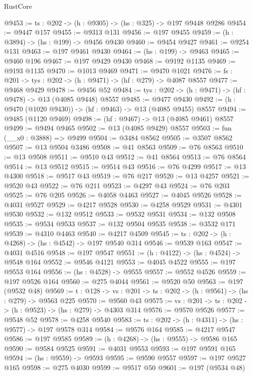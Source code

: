 \begin{lexlean}{RustCore}
\begin{coremodule}
@9453 := {ts : @202} -> (h : @9305) -> (hs : @325) -> @197 @9448 @9286
@9454 := @9447 @157
@9455 := @9313 @131
@9456 := @197 @9455
@9459 := (h : @3894) -> (hs : @199) -> @9456 @9430
@9460 := @9454 @9427
@9461 := @9254 @131
@9463 := @197 @9461 @9430
@9464 := (hs : @199) -> @9463
@9465 := @9460 @196
@9467 := @197 @9429 @9430
@9468 := @9192 @1135
@9469 := @9193 @1135
@9470 := @1013 @9469
@9471 := @9470 @1021
@9476 := {fs : @201} -> {tys : @202} -> (h : @9471) -> (hf : @279) -> @4087 @8557
@9477 := @9468 @9429
@9478 := @9456 @52
@9484 := {tys : @202} -> (h : @9471) -> (hf : @9478) -> @13 (@4085 @9448) @8557
@9485 := @9477 @9430
@9492 := (h : @9470 (@1020 @9430)) -> (hf : @9463) -> @13 (@4085 @9455) @8557
@9494 := @9485 (@1120 @9469)
@9498 := (hf : @9467) -> @13 (@4085 @9461) @8557
@9499 := @9494 @9465
@9502 := @13 (@4085 @9429) @8557
@9503 := fun (__x0 : @3888) => @9499
@9504 := @3484 @8562
@9505 := @3507 @8562
@9507 := @13 @9504 @3486
@9508 := @41 @8563
@9509 := @76 @8563
@9510 := @13 @9508
@9511 := @9510 @43
@9512 := @41 @8564
@9513 := @76 @8564
@9514 := @13 @9512
@9515 := @9514 @43
@9516 := @76 @4299
@9517 := @13 @4300
@9518 := @9517 @43
@9519 := @76 @217
@9520 := @13 @4257
@9521 := @9520 @43
@9522 := @76 @211
@9523 := @4297 @43
@9524 := @76 @203
@9525 := @76 @205
@9526 := @4058 @4463
@9527 := @4045 @9526
@9528 := @4031 @9527
@9529 := @4217 @9528
@9530 := @4258 @9529
@9531 := @4301 @9530
@9532 := @132 @9512
@9533 := @9532 @9531
@9534 := @132 @9508
@9535 := @9534 @9533
@9537 := @132 @9504 @9535
@9538 := @3532 @171
@9539 := @4310 @4463
@9540 := @4217 @4509
@9545 := {ts : @202} -> (h : @4268) -> (hs : @4542) -> @197 @9540 @314
@9546 := @9539 @163
@9547 := @4031 @4516
@9548 := @197 @9547
@9551 := (h : @4122) -> (hs : @4524) -> @9548 @164
@9552 := @9546 @4121
@9553 := @4045 @4522
@9555 := @197 @9553 @164
@9556 := (hs : @4528) -> @9555
@9557 := @9552 @4526
@9559 := @197 @9526 @164
@9560 := @275 @4044
@9561 := @9520 @50
@9563 := @197 (@9532 @48)
@9569 := {t : @128} -> {vs : @201} -> {ts : @202} -> (h : @9561) -> (hs : @279) -> @9563 @225
@9570 := @9560 @43
@9575 := {vs : @201} -> {ts : @202} -> (h : @9523) -> (hs : @279) -> @4303 @314
@9576 := @9570 @9526
@9577 := @9548 @52
@9578 := @4258 @9540
@9583 := {ts : @202} -> (h : @4311) -> (hs : @9577) -> @197 @9578 @314
@9584 := @9576 @164
@9585 := @4217 @9547
@9586 := @197 @9585
@9589 := (h : @4268) -> (hs : @9555) -> @9586 @165
@9590 := @9584 @9525
@9591 := @4031 @9553
@9593 := @197 @9591 @165
@9594 := (hs : @9559) -> @9593
@9595 := @9590 @9557
@9597 := @197 @9527 @165
@9598 := @275 @4030
@9599 := @9517 @50
@9601 := @197 (@9534 @48)

\end{coremodule}
\end{lexlean}
